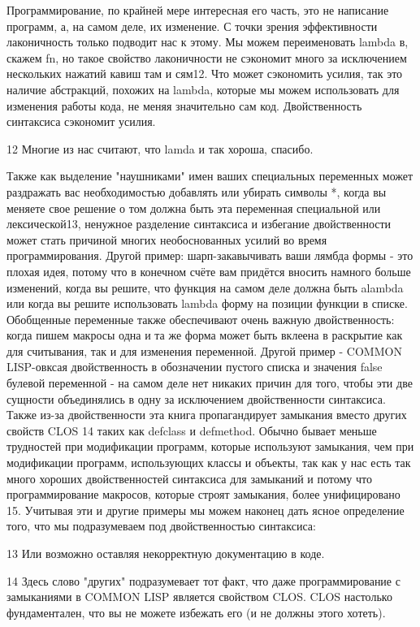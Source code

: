 Программирование, по крайней мере интересная его часть, это не написание программ, а, на самом деле, их изменение. С точки зрения эффективности лаконичность только подводит нас к этому. Мы можем переименовать lambda в, скажем fn, но такое свойство лаконичности не сэкономит много за исключением нескольких нажатий кавиш там и сям12. Что может сэкономить усилия, так это наличие абстракций, похожих на lambda, которые мы можем использовать для изменения работы кода, не меняя значительно сам код. Двойственность синтаксиса сэкономит усилия. 

12 Многие из нас считают, что lamda и так хороша, спасибо.

Также как выделение "наушниками" имен ваших специальных переменных может раздражать вас необходимостью добавлять или убирать символы *, когда вы меняете свое решение о том должна быть эта переменная специальной или лексической13, ненужное разделение синтаксиса и избегание двойственности может стать причиной многих необоснованных усилий во время программирования. Другой пример: шарп-закавычивать ваши лямбда формы - это плохая идея, потому что в конечном счёте вам придётся вносить намного больше изменений, когда вы решите, что функция на самом деле должна быть alambda или когда вы решите использовать lambda форму на позиции функции в списке. Обобщенные переменные также обеспечивают очень важную двойственность: когда пишем макросы одна и та же форма может быть вклеена в раскрытие как для считывания, так и для изменения переменной. Другой пример - COMMON LISP-овксая двойственность в обозначении пустого списка и значения false булевой переменной - на самом деле нет никаких причин для того, чтобы эти две сущности объединялись в одну за исключением двойственности синтаксиса. Также из-за двойственности эта книга пропагандирует замыкания вместо других свойств CLOS 14 таких как defclass и defmethod. Обычно бывает меньше трудностей при модификации программ, которые используют замыкания, чем при модификации программ, использующих классы и объекты, так как у нас есть так много хороших двойственностей синтаксиса для замыканий и потому что программирование макросов, которые строят замыкания, более унифицировано 15. Учитывая эти и другие примеры мы можем наконец дать ясное определение того, что мы подразумеваем под двойственностью синтаксиса:

13 Или возможно оставляя некорректную документацию в коде.

14 Здесь слово "других" подразумевает тот факт, что даже программирование с замыканиями в COMMON LISP является свойством CLOS. CLOS настолько фундаментален, что вы не можете избежать его (и не должны этого хотеть).

